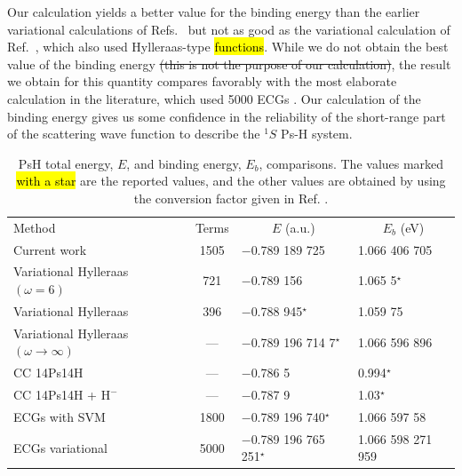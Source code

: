 \documentclass[preprint,showpacs,showkeys,preprintnumbers,amsmath,amssymb,longbibliography,pra,aps]{revtex4-1}
\newcommand*{\thead}[1]{\multicolumn{1}{c}{#1}}
\begin{document}
{Our calculation yields a better value for the binding energy than the earlier 
variational calculations of Refs.~\cite{VanReeth2003,VanReeth2004} but not
as good as the variational calculation of Ref.~\cite{Yan1999}, which also
used Hylleraas-type \hl{functions}. While we do not obtain the best value of the 
binding energy \sout{(this is not the purpose of our calculation)}, the result
we obtain for this quantity compares favorably with the most elaborate 
calculation in the literature, which used 5000 ECGs \cite{Bubin2006}. Our 
calculation of the binding energy gives us some confidence in the reliability 
of the short-range part of the scattering wave function to describe the $^1S$ 
Ps-H system.

\squeezetable  %
\begin{table}
\begin{center}
\begin{ruledtabular}  %
\begin{tabular}{l c l l}
Method & Terms & \thead{$E$ (a.u.)} & \thead{$E_b$ (eV)}\\
\colrule
Current work & 1505 & $-$0.789 189 725 & 1.066 406 705 \\
Variational Hylleraas $(\omega = 6)$ \cite{VanReeth2003} & 721 & $-$0.789 156 & 1.065 5$^\star$ \\
Variational Hylleraas \cite{Ho1986} & 396 & $-$0.788 945$^\star$ & 1.059 75 \\
Variational Hylleraas $(\omega \rightarrow \infty)$ \cite{Yan1999} & --- & $-$0.789 196 714 7$^\star$ & 1.066 596 896 \\
CC 14Ps14H \cite{Blackwood2002} & --- & $-$0.786 5 & 0.994$^\star$ \\
CC 14Ps14H + $\text{H}^-$ \cite{Walters2004} & --- & $-$0.787 9 & 1.03$^\star$\\
ECGs with SVM \cite{Mitroy2006} & 1800 & $-$0.789 196 740$^\star$ & 1.066 597 58 \\
ECGs variational \cite{Bubin2006} & 5000 & $-$0.789 196 765 251$^\star$ & 1.066 598 271 959 \\
\end{tabular}
\end{ruledtabular}
\caption{PsH total energy, $E$, and binding energy, $E_b$, comparisons.
The values marked \hl{with a star} are the
reported values, and the other values are obtained by using the conversion
factor given in Ref. \cite{Mohr2012,*NISTConversions}.}
\label{tab:BoundEnergy}
\end{center}
\end{table}

}
\end{document}
